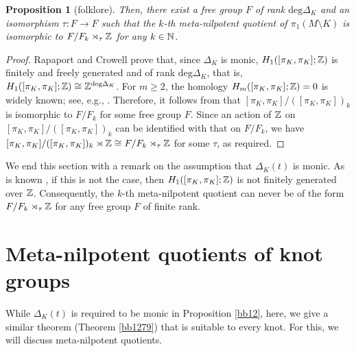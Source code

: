 \documentclass{article}
\theoremstyle{plain}
\newtheorem{prop}[thm]{Proposition}
\theoremstyle{definition}
\newcommand{\ra}{\rightarrow}
\newcommand{\N}{{\Bbb N}}
\newcommand{\Z}{{\Bbb Z}}
\begin{document}
{\begin{prop}[{folklore}]
Then, there exist a free group $F$ of rank $\mathrm{deg} \Delta_K $ and an isomorphism $\tau : F \ra F$ such that the $k$-th meta-nilpotent quotient of $\pi_1(M \setminus K)$ is isomorphic to $F/F_k \rtimes_{\tau} \Z$ for any $k \in \N$.
\end{prop}

\begin{proof}
Rapaport \cite{Ra} and Crowell \cite{Cro} prove that, since $\Delta_K $ is monic, $H_1([\pi_K, \pi_K]; \Z)$ is finitely and freely generated and of rank $\mathrm{deg} \Delta_K $, that is, $H_1([\pi_K, \pi_K]; \Z) \cong \Z^{\mathrm{deg} \Delta_K} $. For $m \geq 2$, the homology $H_m([\pi_K, \pi_K]; \Z)=0$ is widely known; see, e.g., \cite{Cro}. Therefore, it follows from \cite[Theorem 3.4]{Sta} that $[\pi_K, \pi_K]/([\pi_K, \pi_K])_k$ is isomorphic to $F/F_k$ for some free group $F$. Since an action of $\Z$ on $[\pi_K, \pi_K]/([\pi_K, \pi_K])_k$ can be identified with that on $F/F_k$, we have $[\pi_K, \pi_K]/([\pi_K, \pi_K])_k \rtimes \Z \cong F /F_k \rtimes_{\tau} \Z $ for some $\tau$, as required.
\end{proof}
We end this section with a remark on the assumption that $\Delta_K(t)$ is monic. As is known \cite{Cro,Ra}, if this is not the case, then $H_1([\pi_K, \pi_K]; \Z)$ is not finitely generated over $\Z$. Consequently, the $k$-th meta-nilpotent quotient can never be of the form $F/F_k \rtimes_{\tau} \Z$ for any free group $F$ of finite rank.

\section{Meta-nilpotent quotients of knot groups}
\label{Ss45}
While $\Delta_K(t) $ is required to be monic in Proposition \ref{bb12}, here, we give a similar theorem (Theorem \ref{bb1279}) that is suitable to every knot. For this, we will discuss meta-nilpotent quotients.

}
\end{document}
